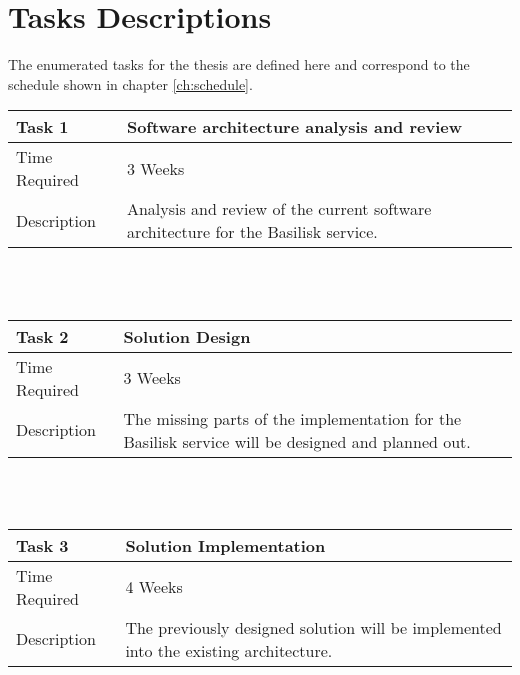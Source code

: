 \chapter{Tasks Descriptions}
\label{ch:tasks}

The enumerated tasks for the thesis are defined here and correspond to the schedule shown in chapter \ref{ch:schedule}. \\

\begin{tabular}{lp{11cm}}
	\toprule
	\textbf{Task 1} & \textbf{Software architecture analysis and review}                                 \\ \midrule
	Time Required   & 3 Weeks                                                                            \\ \midrule
	Description     & Analysis and review of the current software architecture for the Basilisk service. \\ \bottomrule
\end{tabular} \\ \\

\begin{tabular}{lp{11cm}}
	\toprule
	\textbf{Task 2} & \textbf{Solution Design}                                                                           \\ \midrule
	Time Required   & 3 Weeks                                                                                            \\ \midrule
	Description     & The missing parts of the implementation for the Basilisk service will be designed and planned out. \\ \bottomrule
\end{tabular} \\ \\

\begin{tabular}{lp{11cm}}
	\toprule
	\textbf{Task 3} & \textbf{Solution Implementation}                                                     \\ \midrule
	Time Required   & 4 Weeks                                                                              \\ \midrule
	Description     & The previously designed solution will be implemented into the existing architecture. \\ \bottomrule
\end{tabular} \\ \\

